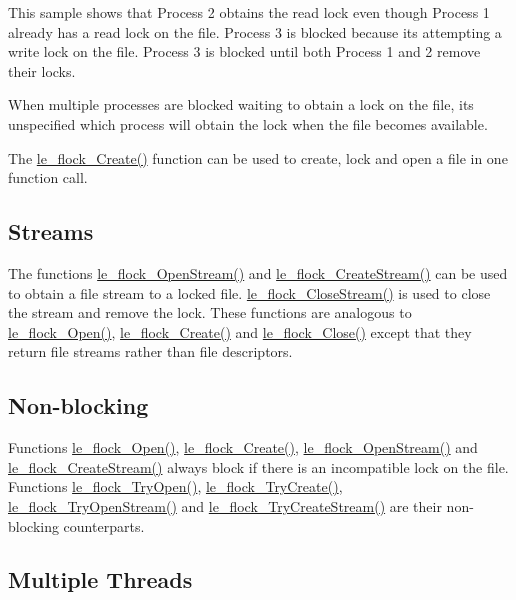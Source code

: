 This sample shows that Process 2 obtains the read lock even though Process 1 already has a read lock on the file. Process 3 is blocked because it\textquotesingle{}s attempting a write lock on the file. Process 3 is blocked until both Process 1 and 2 remove their locks.

When multiple processes are blocked waiting to obtain a lock on the file, it\textquotesingle{}s unspecified which process will obtain the lock when the file becomes available.

The \hyperlink{le__file_lock_8h_a8fdca3e28190ef85e4457ebf009410b5}{le\+\_\+flock\+\_\+\+Create()} function can be used to create, lock and open a file in one function call.\hypertarget{c_flock_c_flock_streams}{}\subsection{Streams}\label{c_flock_c_flock_streams}
The functions {\ttfamily \hyperlink{le__file_lock_8h_ae9a845ef8afe7cb7c4767573a974e5a0}{le\+\_\+flock\+\_\+\+Open\+Stream()}} and {\ttfamily \hyperlink{le__file_lock_8h_a6444d5e3d885a7c346cba6993534020b}{le\+\_\+flock\+\_\+\+Create\+Stream()}} can be used to obtain a file stream to a locked file. {\ttfamily \hyperlink{le__file_lock_8h_a8cd7aad1d732c6719097daf0359bf32f}{le\+\_\+flock\+\_\+\+Close\+Stream()}} is used to close the stream and remove the lock. These functions are analogous to \hyperlink{le__file_lock_8h_aac3e11a6f7f363d29b8dbb1eb6c2c287}{le\+\_\+flock\+\_\+\+Open()}, \hyperlink{le__file_lock_8h_a8fdca3e28190ef85e4457ebf009410b5}{le\+\_\+flock\+\_\+\+Create()} and \hyperlink{le__file_lock_8h_a457a07dbf8967757322f531d5beb10b6}{le\+\_\+flock\+\_\+\+Close()} except that they return file streams rather than file descriptors.\hypertarget{c_flock_c_flock_nonblock}{}\subsection{Non-\/blocking}\label{c_flock_c_flock_nonblock}
Functions \hyperlink{le__file_lock_8h_aac3e11a6f7f363d29b8dbb1eb6c2c287}{le\+\_\+flock\+\_\+\+Open()}, \hyperlink{le__file_lock_8h_a8fdca3e28190ef85e4457ebf009410b5}{le\+\_\+flock\+\_\+\+Create()}, \hyperlink{le__file_lock_8h_ae9a845ef8afe7cb7c4767573a974e5a0}{le\+\_\+flock\+\_\+\+Open\+Stream()} and \hyperlink{le__file_lock_8h_a6444d5e3d885a7c346cba6993534020b}{le\+\_\+flock\+\_\+\+Create\+Stream()} always block if there is an incompatible lock on the file. Functions \hyperlink{le__file_lock_8h_add7b73f75a8e7956a397081987458590}{le\+\_\+flock\+\_\+\+Try\+Open()}, \hyperlink{le__file_lock_8h_a4f7b134b467adb749401f2ef2ccd92d2}{le\+\_\+flock\+\_\+\+Try\+Create()}, \hyperlink{le__file_lock_8h_aa4712b501c620401a3f269c5cb34d91a}{le\+\_\+flock\+\_\+\+Try\+Open\+Stream()} and \hyperlink{le__file_lock_8h_aa1c3c10f1f72a5541f31855b5c2eed98}{le\+\_\+flock\+\_\+\+Try\+Create\+Stream()} are their non-\/blocking counterparts.\hypertarget{c_flock_c_flock_threads}{}\subsection{Multiple Threads}\label{c_flock_c_flock_threads}
